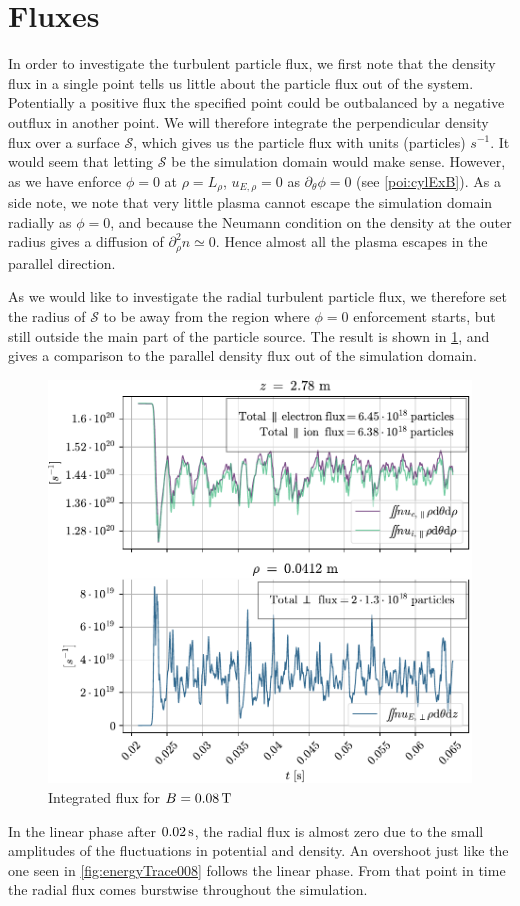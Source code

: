 \section{Fluxes}
%
In order to investigate the turbulent particle flux, we first note that the density flux in a single point tells us little about the particle flux out of the system.
Potentially a positive flux the specified point could be outbalanced by a negative outflux in another point.
We will therefore integrate the perpendicular density flux over a surface $\mathcal{S}$, which gives us the particle flux with units (particles) $s^{-1}$.
It would seem that letting $\mathcal{S}$ be the simulation domain would make sense.
However, as we have enforce $\phi=0$ at $\rho=L_\rho$, $u_{E,\rho}=0$ as $\partial_\theta \phi=0$ (see \cref{poi:cylExB}).
As a side note, we note that very little plasma cannot escape the simulation domain radially as $\phi=0$, and because the Neumann condition on the density at the outer radius gives a diffusion of $\partial_\rho^2 n \simeq 0$.
Hence almost all the plasma escapes in the parallel direction.

As we would like to investigate the radial turbulent particle flux, we therefore set the radius of $\mathcal{S}$ to be away from the region where $\phi=0$ enforcement starts, but still outside the main part of the particle source.
The result is shown in \cref{fig:flux0008}, and gives a comparison to the parallel density flux out of the simulation domain.
%
\begin{figure}[htb]
    \centering
    \includegraphics{fig/results/totalFlux/flux0008}
    \caption{Integrated flux for $B=0.08\, \text{T}$}
    \label{fig:flux0008}
\end{figure}
%
In the linear phase after $0.02\, \text{s}$, the radial flux is almost zero due to the small amplitudes of the fluctuations in potential and density.
An overshoot just like the one seen in \cref{fig:energyTrace008} follows the linear phase.
From that point in time the radial flux comes burstwise throughout the simulation.

